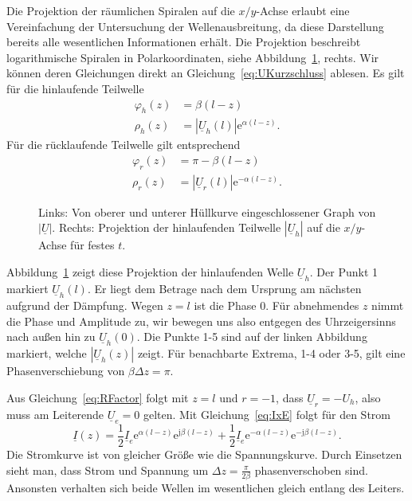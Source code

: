 \documentclass[paper=a4, parskip=half-, ngerman, fontsize=11pt]{scrreprt}
\begin{document}
Die Projektion der räumlichen Spiralen auf die $x/y$-Achse erlaubt eine Vereinfachung der Untersuchung der
Wellenausbreitung, da diese Darstellung bereits alle wesentlichen Informationen erhält. Die Projektion beschreibt
logarithmische Spiralen in Polarkoordinaten, siehe Abbildung~\ref{Spirale}, rechts. Wir können deren Gleichungen direkt
an Gleichung~\eqref{eq:UKurzschluss} ablesen. Es gilt für die hinlaufende Teilwelle
\begin{align*}
    \varphi_{h}(z) &= \beta (l - z) \\[1ex]
    \rho_{h}(z) &= \left| \underline{U}_{h}(l) \right| \mathrm{e}^{\alpha (l - z)}.
\end{align*}
Für die rücklaufende Teilwelle gilt entsprechend
\begin{align*}
    \varphi_{r}(z) &= \pi - \beta (l - z) \\[1ex]
    \rho_{r}(z) &= \left| \underline{U}_{r}(l) \right| \mathrm{e}^{- \alpha (l - z)}.
\end{align*}

\begin{figure}[!htb]
    \begin{subfigure}[b]{0.49\textwidth}
        \centering
        
    \end{subfigure}%
    \hfill
    \begin{subfigure}[b]{0.4\textwidth}
        \centering
        
    \end{subfigure}
    \caption{Links: Von oberer und unterer Hüllkurve eingeschlossener Graph von $\left| \underline{U} \right|$. Rechts:
    Projektion der hinlaufenden Teilwelle $\left| \underline{U}_h \right|$ auf die $x/y$-Achse für festes $t$.}
    \label{Spirale}
\end{figure}
Abbildung~\ref{Spirale} zeigt diese Projektion der hinlaufenden Welle $\underline{U}_{h}$. Der Punkt 1 markiert
$\underline{U}_{h}(l)$. Er liegt dem Betrage nach dem Ursprung am nächsten aufgrund der Dämpfung. Wegen $z=l$ ist die
Phase 0. Für abnehmendes $z$ nimmt die Phase und Amplitude zu, wir bewegen uns also entgegen des Uhrzeigersinns nach
außen hin zu $\underline{U}_{h}(0)$. Die Punkte 1-5 sind auf der linken Abbildung markiert, welche
$|\underline{U}_{h}(z)|$ zeigt. Für benachbarte Extrema, 1-4 oder 3-5, gilt eine Phasenverschiebung von $\beta \Delta z
= \pi$.

Aus Gleichung~\eqref{eq:RFactor} folgt mit $z=l$ und $r=-1$, dass $\underline{U}_{r} = - U_{h}$, also muss am
Leiterende $\underline{U}_{e} = 0$ gelten. Mit Gleichung~\eqref{eq:IxE} folgt für den Strom
\[
\underline{I}(z) =
\frac{1}{2} \underline{I}_{e} \mathrm{e}^{\alpha (l - z)} \mathrm{e}^{\mathrm{j} \beta (l - z)}
+
\frac{1}{2} \underline{I}_{e} \mathrm{e}^{- \alpha (l - z)} \mathrm{e}^{- \mathrm{j} \beta (l - z)}.
\]
Die Stromkurve ist von gleicher Größe wie die Spannungskurve. Durch Einsetzen sieht man, dass Strom und Spannung um
$\Delta z = \frac{\pi}{2 \beta}$ phasenverschoben sind. Ansonsten verhalten sich beide Wellen im wesentlichen gleich
entlang des Leiters.
\end{document}

